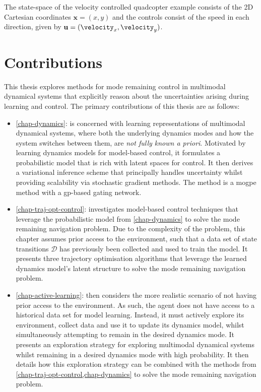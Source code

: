 \documentclass{mimosis-class/mimosis}
\numberwithin{equation}{chapter}
\newcommand{\state}{\ensuremath{\mathbf{x}}}
\newcommand{\control}{\ensuremath{\mathbf{u}}}
\begin{document}
The state-space of the velocity controlled quadcopter example consists of the 2D Cartesian coordinates \(\state = (x, y)\)
and the controls consist of the speed in each direction, given by \(\control = (\velocity_x, \velocity_y)\).

\section{Contributions}
\label{sec:orga2c8129}
This thesis explores methods for mode remaining control in multimodal dynamical systems that explicitly reason
about the uncertainties arising during learning and control.
The primary contributions of this thesis are as follows:
\begin{itemize}
\item \cref{chap-dynamics}: is concerned with learning representations of multimodal dynamical
systems, where both the underlying dynamics modes and how the system switches between them, are \emph{not fully known a priori}.
Motivated by learning dynamics models for model-based control, it formulates a probabilistic model that is
rich with latent spaces for control.
It then derives a variational inference scheme that principally handles uncertainty whilst providing scalability
via stochastic gradient methods.
The method is a \acrfull{mogpe} method with a \acrfull{gp}-based gating network.
\item \cref{chap-traj-opt-control}: investigates model-based control techniques that leverage the probabilistic model
from \cref{chap-dynamics} to solve the mode remaining navigation problem.
Due to the complexity of the problem, this chapter
assumes prior access to the environment, such that a data set of state transitions \(\mathcal{D}\) has
previously been collected and used to train the model. It presents three trajectory optimisation algorithms that
leverage the learned dynamics model's latent structure to solve the mode remaining navigation problem.
\item \cref{chap-active-learning}: then considers the more realistic scenario of not having prior access
to the environment. As such, the agent does not have access to a historical data set for model learning.
Instead, it must actively explore its environment, collect data and use it to update its dynamics model,
whilst simultaneously attempting to remain in the desired dynamics mode.
It presents an exploration strategy for exploring multimodal dynamical systems whilst remaining in a
desired dynamics mode with high probability.
It then details how this exploration strategy can be combined with the methods from
\cref{chap-traj-opt-control,chap-dynamics} to solve the mode remaining navigation problem.
\end{itemize}
\end{document}

